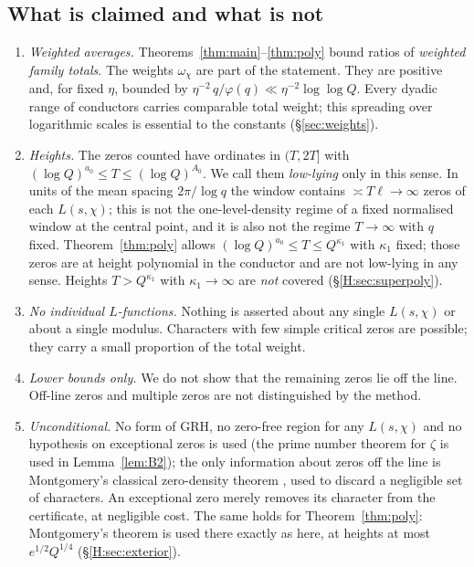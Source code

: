 \documentclass[11pt]{amsart}
\theoremstyle{definition}
\theoremstyle{remark}
\numberwithin{equation}{section}
\begin{document}
\subsection{What is claimed and what is not}\label{sec:scope}
\begin{enumerate}[label=(\arabic*),leftmargin=*]
\item \emph{Weighted averages.} Theorems~\ref{thm:main}--\ref{thm:poly} bound ratios of \emph{weighted family totals}. The weights $\omega_\chi$ are part of the statement. They are positive and, for fixed $\eta$, bounded by $\eta^{-2}\,q/\varphi(q)\ll\eta^{-2}\log\log Q$. Every dyadic range of conductors carries comparable total weight; this spreading over logarithmic scales is essential to the constants (\S\ref{sec:weights}).
\item \emph{Heights.} The zeros counted have ordinates in $(T,2T]$ with $(\log Q)^{a_0}\le T\le(\log Q)^{A_0}$. We call them \emph{low-lying} only in this sense. In units of the mean spacing $2\pi/\log q$ the window contains $\asymp T\ell\to\infty$ zeros of each $L(s,\chi)$; this is not the one-level-density regime of a fixed normalised window at the central point, and it is also not the regime $T\to\infty$ with $q$ fixed. Theorem~\ref{thm:poly} allows $(\log Q)^{a_0}\le T\le Q^{\kappa_1}$ with $\kappa_1$ fixed; those zeros are at height polynomial in the conductor and are not low-lying in any sense. Heights $T>Q^{\kappa_1}$ with $\kappa_1\to\infty$ are \emph{not} covered (\S\ref{H:sec:superpoly}).
\item \emph{No individual $L$-functions.} Nothing is asserted about any single $L(s,\chi)$ or about a single modulus. Characters with few simple critical zeros are possible; they carry a small proportion of the total weight.
\item \emph{Lower bounds only.} We do not show that the remaining zeros lie off the line. Off-line zeros and multiple zeros are not distinguished by the method.
\item \emph{Unconditional.} No form of GRH, no zero-free region for any $L(s,\chi)$ and no hypothesis on exceptional zeros is used (the prime number theorem for $\zeta$ is used in Lemma~\ref{lem:B2}); the only information about zeros off the line is Montgomery's classical zero-density theorem \cite{Mon69}, used to discard a negligible set of characters. An exceptional zero merely removes its character from the certificate, at negligible cost. The same holds for Theorem~\ref{thm:poly}: Montgomery's theorem is used there exactly as here, at heights at most $e^{1/2}Q^{1/4}$ (\S\ref{H:sec:exterior}).

\end{enumerate}
\end{document}
